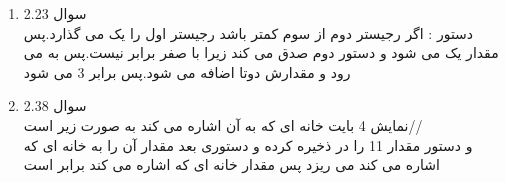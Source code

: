 \documentclass[a4paper]{article}
\begin{document}
\begin{enumerate}
\item{سوال 2.23}\\
دستور
:
اگر رجیستر دوم از سوم کمتر باشد رجیستر اول را یک می گذارد.پس مقدار 
یک می شود و دستور دوم صدق می کند زیرا با صفر برابر نیست.پس به 
می رود و مقدارش دوتا اضافه می شود.پس 
برابر 3 می شود	

\item{سوال 2.38}\\

نمایش 4 بایت خانه ای که 
به آن اشاره می کند به صورت زیر است//
\\
و دستور
مقدار 11 را در
ذخیره کرده و دستوری بعد مقدار آن را به خانه ای که
اشاره می کند می ریزد
پس مقدار خانه ای که 
اشاره می کند برابر
است

\end{enumerate}
\end{document}
